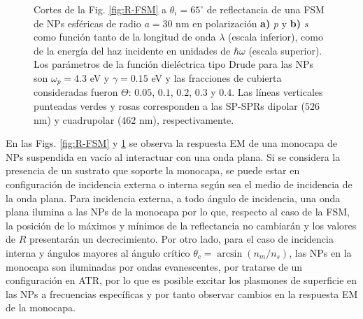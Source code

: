 \begin{figure}[h!]
	\caption{Cortes de la Fig. \ref{fig:R-FSM} a $\theta_i = 65^\circ$ de reflectancia de una FSM de NPs esféricas de radio $a=30$ nm en polarización \textbf{a)} \emph{p} y \textbf{b)} \emph{s} como función tanto de la longitud de onda $\lambda$ (escala inferior), como de la energía del haz incidente en unidades de $\hbar\omega$ (escala superior). Los parámetros de la función dieléctrica tipo Drude para las NPs son $\omega_p = 4.3$ eV y $\gamma = 0.15$ eV y las fracciones de cubierta consideradas fueron $\Theta$: $0. 05$, $0. 1$, $0. 2$, $0. 3$ y $0. 4$. Las líneas verticales punteadas verdes y rosas corresponden a las SP-SPRs dipolar ($526$ nm) y cuadrupolar ($462$ nm), respectivamente.}\label{fig:FSM-Cuts}
	\end{figure}	


En las Figs. \ref{fig:R-FSM} y \ref{fig:FSM-Cuts} se observa la respuesta EM de una monocapa de NPs suspendida en vacío al interactuar con una onda plana. Si se considera la presencia de un sustrato que soporte la monocapa, se puede estar en configuraci\'on de incidencia externa o interna seg\'un sea el medio de incidencia de la onda plana. Para incidencia externa, a todo ángulo de incidencia,  una onda plana ilumina a las NPs de la monocapa por lo que, respecto al caso de la FSM, la posición de lo máximos y mínimos de la reflectancia no cambiarán y los valores de $R$ presentarán un decrecimiento. Por otro lado, para el caso de incidencia interna y ángulos mayores al ángulo crítico $\theta_c = \arcsin(n_m/n_s)$, las NPs en la monocapa son iluminadas por ondas evanescentes, por tratarse de un configuración en ATR, por lo que es posible excitar los plasmones de superficie en las NPs a frecuencias específicas y por tanto observar cambios en la respuesta EM de la monocapa.

